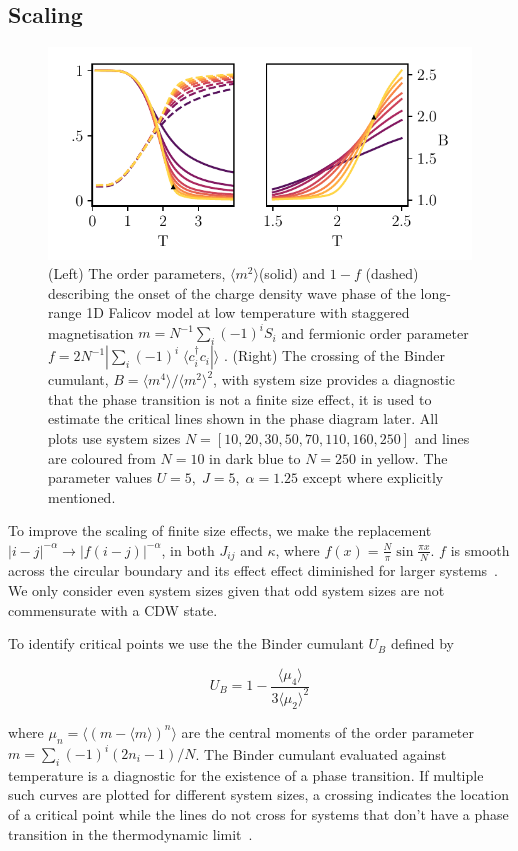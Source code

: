 \hypertarget{scaling}{%
\subsection{Scaling}\label{scaling}}

\hypertarget{fig:binder_cumulants}{%
\begin{figure}
\centering
\includegraphics[width=1\textwidth,height=\textheight]{figure_code/fk_chapter/binder_cumulants/binder_cumulants}
\caption[{Binder Cumulants}]{(Left) The order parameters, \(\langle m^2 \rangle\)(solid) and \(1 - f\) (dashed) describing the onset of the charge density wave phase of the long-range 1D Falicov model at low temperature with staggered magnetisation \(m = N^{-1} \sum_i (-1)^i S_i\) and fermionic order parameter \(f = 2 N^{-1}|\sum_i (-1)^i \; \langle c^\dagger_{i}c_{i}| \rangle\) . (Right) The crossing of the Binder cumulant, \(B = \langle m^4 \rangle / \langle m^2 \rangle^2\), with system size provides a diagnostic that the phase transition is not a finite size effect, it is used to estimate the critical lines shown in the phase diagram later. All plots use system sizes \(N = [10,20,30,50,70,110,160,250]\) and lines are coloured from \(N = 10\) in dark blue to \(N = 250\) in yellow. The parameter values \(U = 5,\;J = 5,\;\alpha = 1.25\) except where explicitly mentioned.}
\label{fig:binder_cumulants}
\end{figure}
}

To improve the scaling of finite size effects, we make the replacement \(|i - j|^{-\alpha} \rightarrow |f(i - j)|^{-\alpha}\), in both \(J_{ij}\) and \(\kappa\), where \(f(x) = \frac{N}{\pi}\sin \frac{\pi x}{N}\). \(f\) is smooth across the circular boundary and its effect effect diminished for larger systems~\autocite{fukuiOrderNClusterMonte2009}. We only consider even system sizes given that odd system sizes are not commensurate with a CDW state.

To identify critical points we use the the Binder cumulant \(U_B\) defined by

\[
U_B = 1 - \frac{\langle\mu_4\rangle}{3\langle\mu_2\rangle^2}
\]

where \(\mu_n = \langle(m - \langle m\rangle)^n\rangle\) are the central moments of the order parameter \(m = \sum_i (-1)^i (2n_i - 1) / N\). The Binder cumulant evaluated against temperature is a diagnostic for the existence of a phase transition. If multiple such curves are plotted for different system sizes, a crossing indicates the location of a critical point while the lines do not cross for systems that don't have a phase transition in the thermodynamic limit~\autocite{binderFiniteSizeScaling1981,musialMonteCarloSimulations2002}.
